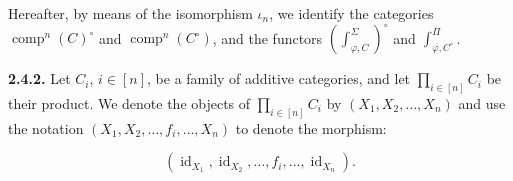 Hereafter, by means of the isomorphism $\iota_n$, we identify the
categories $\operatorname{comp}^{n}(C)^\circ$ and
$\operatorname{comp}^{n}(C^\circ)$, and the functors
$\left(\int_{\varphi,C}^{\Sigma}\right)^\circ$ and
$\int_{\varphi,C^\circ}^{\Pi}$.

\noindent\textbf{2.4.2.}\quad
Let $C_i$, $i\in[n]$, be a family of additive categories, and let
$\prod_{i\in[n]}C_i$ be their product. We denote the objects of
$\prod_{i\in[n]}C_i$ by $(X_1,X_2,\ldots,X_n)$ and use the notation
$(X_1,X_2,\ldots,f_i,\ldots,X_n)$ to denote the morphism:

\begin{equation*}
  (\operatorname{id}_{X_1},\operatorname{id}_{X_2},\ldots,
  f_i,\ldots,\operatorname{id}_{X_n}).
\end{equation*}
